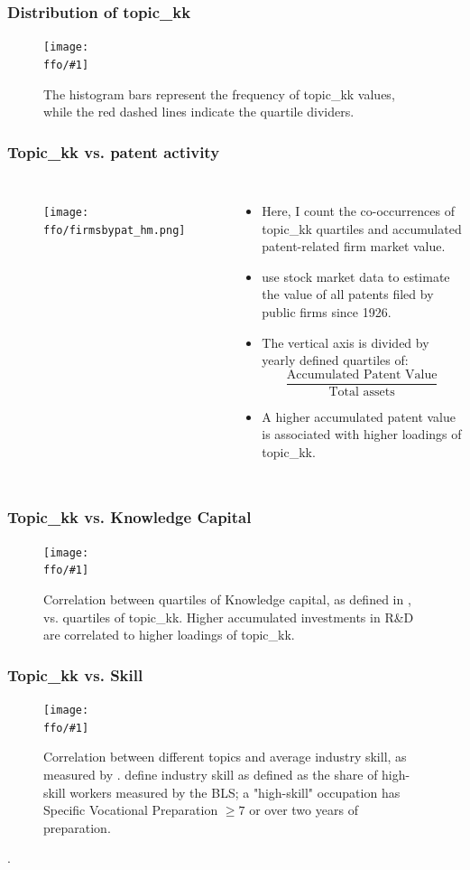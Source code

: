 \documentclass{beamer}
\newcommand{\ffo}{dicfullmc10thr10defnob5noa0_8_4t}
\newcommand{\insertfigure}[2]{
\begin{figure}[h!]
  \centering
  \texttt{[image: \\ffo/\#1]}
  \centering
  \captionsetup{font=scriptsize}
  \caption{#2}
  \label{fig:#1}
\end{figure}
}
\begin{document}
\begin{frame}
  \frametitle{Distribution of topic\_kk}
  \insertfigure{topickk_distr.png}{The histogram bars represent the frequency of topic\_kk values, while the red dashed lines indicate the quartile dividers. }
\end{frame}


\begin{frame}
\frametitle{Topic\_kk vs. patent activity}
       \begin{columns}
             \begin{figure}[h!]
		  \centering
		  \texttt{[image: \\ffo/firmsbypat\_hm.png]}
		  \captionsetup{font=scriptsize}
		  \label{fig:firmsbypathm}
			\end{figure}
          \scriptsize
              \begin{itemize}
              \item Here, I count the co-occurrences of topic\_kk quartiles and accumulated patent-related firm market value.
              \item \cite{Kogan2017-fx} use stock market data to estimate the value of all patents filed by public firms since 1926.
			  \item The vertical axis is divided by yearly defined quartiles of:
			  \begin{equation}
  				\frac{\text{Accumulated Patent Value}}{\text{Total assets}}
				\end{equation}
			  \item A higher accumulated patent value is associated with higher loadings of topic\_kk.
			\end{itemize}
	  \end{columns} 
\end{frame}

\begin{frame}
\frametitle{Topic\_kk vs. Knowledge Capital}
\scriptsize
\insertfigure{topicvskkpt_hm}{Correlation between quartiles of Knowledge capital,  as defined in \cite{Peters2017-fl}, vs. quartiles of topic\_kk. Higher accumulated investments in R\&D are correlated to higher loadings of topic\_kk.}
\end{frame}

\begin{frame}
\frametitle{Topic\_kk vs. Skill}
\scriptsize
\insertfigure{heatmap}{Correlation between different topics and average industry skill, as measured by \cite{Belo2017-qi}. \cite{Belo2017-qi} define industry skill as defined as the share of high-skill workers measured by the BLS; a "high-skill" occupation has Specific Vocational Preparation $\geq 7$ or over two years of preparation.}. 
\end{frame}
\end{document}
